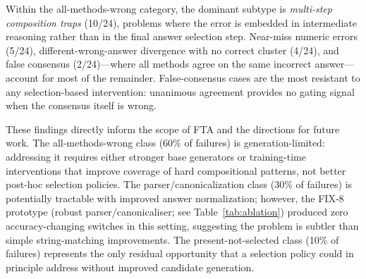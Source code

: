 \documentclass[smallcondensed]{svjour3}
\begin{document}
Within the all-methods-wrong category, the dominant subtype is
\emph{multi-step composition traps} (10/24), problems where the error is
embedded in intermediate reasoning rather than in the final answer selection
step.
Near-miss numeric errors (5/24), different-wrong-answer divergence with no
correct cluster (4/24), and false consensus (2/24)---where all methods agree
on the same incorrect answer---account for most of the remainder.
False-consensus cases are the most resistant to any selection-based
intervention: unanimous agreement provides no gating signal when the
consensus itself is wrong.

These findings directly inform the scope of FTA and the directions for future
work.
The all-methods-wrong class (60\% of failures) is generation-limited:
addressing it requires either stronger base generators or training-time
interventions that improve coverage of hard compositional patterns, not better
post-hoc selection policies.
The parser/canonicalization class (30\% of failures) is potentially tractable
with improved answer normalization; however, the FIX-8 prototype (robust
parser/canonicaliser; see Table~\ref{tab:ablation}) produced zero
accuracy-changing switches in this setting, suggesting the problem is subtler
than simple string-matching improvements.
The present-not-selected class (10\% of failures) represents the only residual
opportunity that a selection policy could in principle address without improved
candidate generation.

\begin{table}[t]
\centering
\caption{Failure taxonomy for final300 residual errors.}
\label{tab:failure_taxonomy}
\scriptsize
{}
\end{table}
\end{document}
